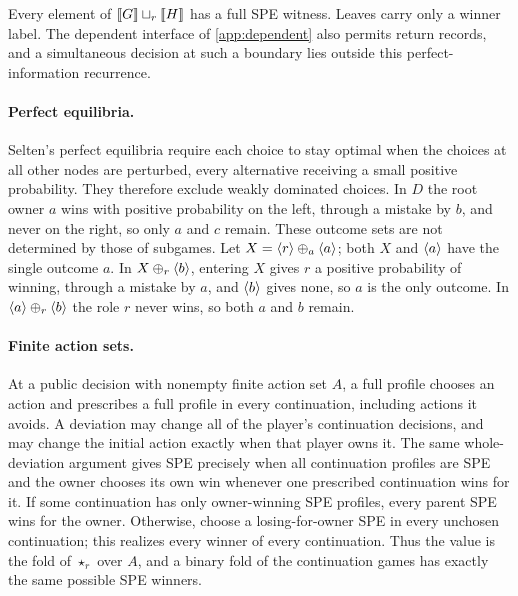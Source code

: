 Every element of $\llbracket G\rrbracket\mathbin{\sqcup_{r}}\llbracket H\rrbracket$ has a full SPE witness. Leaves carry only a winner label. The dependent interface of \cref{app:dependent} also permits return records, and a simultaneous decision at such a boundary lies outside this perfect-information recurrence.

\paragraph{Perfect equilibria.}
Selten's perfect equilibria \cite{Selten1975} require each choice to stay optimal when the choices at all other nodes are perturbed, every alternative receiving a small positive probability. They therefore exclude weakly dominated choices. In $D$ the root owner $a$ wins with positive probability on the left, through a mistake by $b$, and never on the right, so only $a$ and $c$ remain. These outcome sets are not determined by those of subgames. Let $X=\langle r\rangle\mathbin{\oplus_{a}}\langle a\rangle$; both $X$ and $\langle a\rangle$ have the single outcome $a$. In $X\mathbin{\oplus_{r}}\langle b\rangle$, entering $X$ gives $r$ a positive probability of winning, through a mistake by $a$, and $\langle b\rangle$ gives none, so $a$ is the only outcome. In $\langle a\rangle\mathbin{\oplus_{r}}\langle b\rangle$ the role $r$ never wins, so both $a$ and $b$ remain.

\paragraph{Finite action sets.}
At a public decision with nonempty finite action set $A$, a full profile
chooses an action and prescribes a full profile in every continuation,
including actions it avoids. A deviation may change all of the player's
continuation decisions, and may change the initial action exactly when that
player owns it. The same whole-deviation argument gives SPE precisely when
all continuation profiles are SPE and the owner chooses its own win whenever
one prescribed continuation wins for it. If some continuation has only
owner-winning SPE profiles, every parent SPE wins for the owner. Otherwise,
choose a losing-for-owner SPE in every unchosen continuation; this realizes
every winner of every continuation. Thus the value is the fold of
$\star_r$ over $A$, and a binary fold of the continuation games has exactly
the same possible SPE winners.

